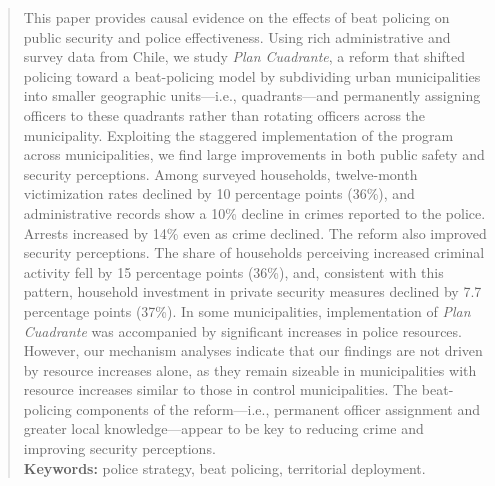 \begin{quote}
This paper provides causal evidence on the effects of beat policing on public security and police effectiveness. Using rich administrative and survey data from Chile, we study \emph{Plan Cuadrante}, a reform that shifted policing toward a beat-policing model by subdividing urban municipalities into smaller geographic units---i.e., quadrants---and permanently assigning officers to these quadrants rather than rotating officers across the municipality. Exploiting the staggered implementation of the program across municipalities, we find large improvements in both public safety and security perceptions. Among surveyed households, twelve-month victimization rates declined by 10 percentage points (36\%), and administrative records show a 10\% decline in crimes reported to the police. Arrests increased by 14\% even as crime declined. The reform also improved security perceptions. The share of households perceiving increased criminal activity fell by 15 percentage points (36\%), and, consistent with this pattern, household investment in private security measures declined by 7.7 percentage points (37\%). In some municipalities, implementation of \emph{Plan Cuadrante} was accompanied by significant increases in police resources. However, our mechanism analyses indicate that our findings are not driven by resource increases alone, as they remain sizeable in municipalities with resource increases similar to those in control municipalities. The beat-policing components of the reform---i.e., permanent officer assignment and greater local knowledge---appear to be key to reducing crime and improving security perceptions.
\\[12pt]
\noindent\textbf{Keywords:} police strategy, beat policing, territorial deployment.\\

\end{quote}